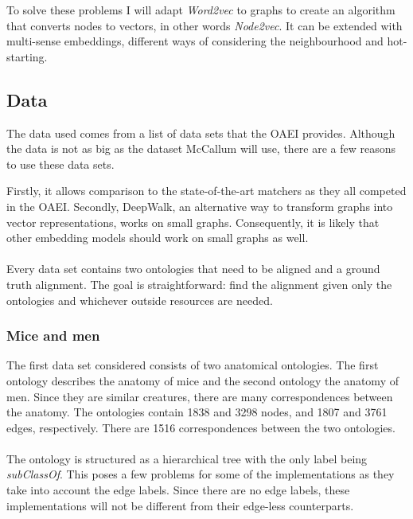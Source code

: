 \documentclass{article}
\begin{document}
 To solve these problems I will adapt \emph{Word2vec} to graphs to create an algorithm that converts nodes to vectors, in other words \emph{Node2vec}. It can be extended with multi-sense embeddings, different ways of considering the neighbourhood and hot-starting.
 
  \subsection{Data}
 The data used comes from a list of data sets that the OAEI provides\cite{euzenat2013ontology}. Although the data is not as big as the dataset McCallum will use, there are a few reasons to use these data sets.
 
 Firstly, it allows comparison to the state-of-the-art matchers as they all competed in the OAEI. Secondly, DeepWalk, an alternative way to transform graphs into vector representations, works on small graphs. Consequently, it is likely that other embedding models should work on small graphs as well.
 \paragraph{}
 Every data set contains two ontologies that need to be aligned and a ground truth alignment. The goal is straightforward: find the alignment given only the ontologies and whichever outside resources are needed.

 \subsubsection{Mice and men}
 The first data set considered consists of two anatomical ontologies. The first ontology describes the anatomy of mice and the second ontology the anatomy of men. Since they are similar creatures, there are many correspondences between the anatomy. The ontologies contain 1838 and 3298 nodes, and 1807 and 3761 edges, respectively. There are 1516 correspondences between the two ontologies.
 \paragraph{}
 The ontology is structured as a hierarchical tree with the only label being \emph{subClassOf}. This poses a few problems for some of the implementations as they take into account the edge labels. Since there are no edge labels, these implementations will not be different from their edge-less counterparts.
\end{document}
